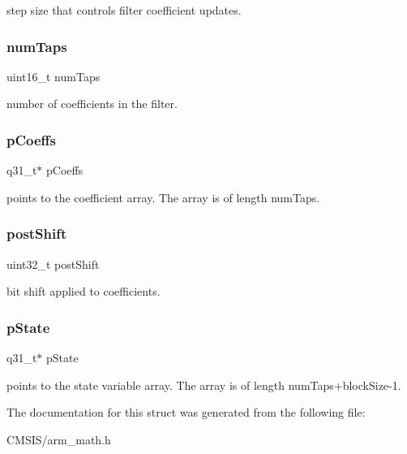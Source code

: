 step size that controls filter coefficient updates. \mbox{\label{structarm__lms__instance__q31_a751941891e47f522a7f5375fe8990aac}} 
\subsubsection{\texorpdfstring{numTaps}{numTaps}}
{\footnotesize\ttfamily uint16\+\_\+t num\+Taps}

number of coefficients in the filter. \mbox{\label{structarm__lms__instance__q31_a68888e36167d81cb7836db10367a1682}} 
\subsubsection{\texorpdfstring{pCoeffs}{pCoeffs}}
{\footnotesize\ttfamily q31\+\_\+t$\ast$ p\+Coeffs}

points to the coefficient array. The array is of length num\+Taps. \mbox{\label{structarm__lms__instance__q31_aa2cacddfc5e1d86905d7d31a18b1979b}} 
\subsubsection{\texorpdfstring{postShift}{postShift}}
{\footnotesize\ttfamily uint32\+\_\+t post\+Shift}

bit shift applied to coefficients. \mbox{\label{structarm__lms__instance__q31_adee4ba3ee8869865af7d8fa08ca913d6}} 
\subsubsection{\texorpdfstring{pState}{pState}}
{\footnotesize\ttfamily q31\+\_\+t$\ast$ p\+State}

points to the state variable array. The array is of length num\+Taps+block\+Size-\/1. 

The documentation for this struct was generated from the following file\+:\begin{DoxyCompactItemize}
\item 
C\+M\+S\+I\+S/arm\+\_\+math.\+h\end{DoxyCompactItemize}

